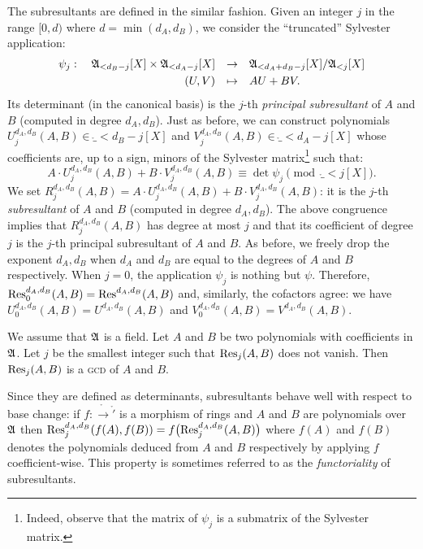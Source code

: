\documentclass{article}
\begin{document}
\medskip

The subresultants are defined in the similar fashion. Given an
integer $j$ in the range $[0, d)$ where $d = \min(d_A, d_B)$, we
consider the ``truncated'' Sylvester application:
$$\begin{array}{rcl}
\psi_j : \quad
\ring_{< d_B-j}[X] \times \ring_{< d_A-j}[X] & \to &
\ring_{< d_A+d_B-j}[X]/\ring_{< j}[X] \smallskip \\
(U,V) & \mapsto & AU + BV.
\end{array}$$
Its determinant (in the canonical basis) is the $j$-th \emph{principal 
subresultant} of $A$ and $B$ (computed in degree $d_A, d_B$). Just 
as before, we can construct polynomials $U_j^{d_A, d_B}(A,B) \in
\ring_{< d_B-j}[X]$ and $V_j^{d_A, d_B}(A,B) \in \ring_{< d_A-j}[X]$
whose coefficients are, up to a sign, minors of the Sylvester 
matrix\footnote{Indeed, observe that the matrix of $\psi_j$ is a
submatrix of the Sylvester matrix.} such that:
$$A \cdot U_j^{d_A, d_B}(A,B) + B \cdot V_j^{d_A, d_B}(A,B) 
\equiv \det \psi_j \pmod {\ring_{< j}[X]}.$$
We set $R_j^{d_A, d_B}(A,B) = A \cdot U_j^{d_A, d_B}(A,B) + B \cdot 
V_j^{d_A, d_B}(A,B)$: it is the $j$-th \emph{subresultant} of $A$
and $B$ (computed in degree $d_A, d_B$). The above congruence implies
that $R_j^{d_A, d_B}(A,B)$ has degree at most $j$ and that its
coefficient of degree $j$ is the $j$-th principal subresultant of $A$
and $B$. As before, we freely drop the exponent $d_A, d_B$ when
$d_A$ and $d_B$ are equal to the degrees of $A$ and $B$ respectively.
When $j=0$, the application $\psi_j$ is nothing but $\psi$. Therefore,
$\text{\rm Res}_0^{d_A, d_B}(A,B) = \text{\rm Res}^{d_A, d_B}(A,B)$ and, similarly, the
cofactors agree: we have $U_0^{d_A, d_B}(A,B) = U^{d_A, d_B}(A,B)$
and $V_0^{d_A, d_B}(A,B) = V^{d_A, d_B}(A,B)$.

\begin{theo}
We assume that $\mathfrak A$ is a field. Let $A$ and $B$ be two polynomials
with coefficients in $\mathfrak A$. Let $j$ be the smallest integer such
that $\text{\rm Res}_j(A,B)$ does not vanish. Then $\text{\rm Res}_j(A,B)$ is a \textsc{gcd}
of $A$ and $B$.
\end{theo}

Since they are defined as determinants, subresultants behave well with 
respect to base change: if $f : \ring \to \ring'$ is a morphism of rings 
and $A$ and $B$ are polynomials over $\mathfrak A$ then
$\text{\rm Res}_j^{d_A,d_B}(f(A),f(B)) = f\big(\text{\rm Res}_j^{d_A,d_B}(A,B)\big)$
where $f(A)$ and $f(B)$ denotes the polynomials deduced from $A$
and $B$ respectively by applying $f$ coefficient-wise. This property
is sometimes referred to as the \emph{functoriality} of subresultants.
\end{document}
